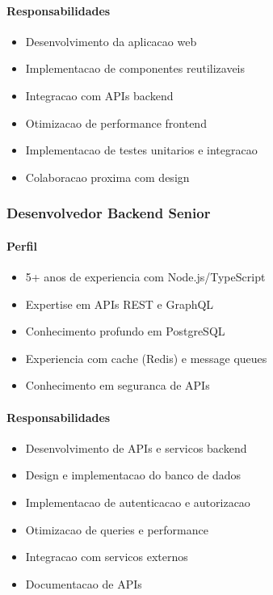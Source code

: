 \paragraph{Responsabilidades}
\begin{itemize}
    \item Desenvolvimento da aplicacao web
    \item Implementacao de componentes reutilizaveis
    \item Integracao com APIs backend
    \item Otimizacao de performance frontend
    \item Implementacao de testes unitarios e integracao
    \item Colaboracao proxima com design
\end{itemize}

\subsubsection{Desenvolvedor Backend Senior}
\paragraph{Perfil}
\begin{itemize}
    \item 5+ anos de experiencia com Node.js/TypeScript
    \item Expertise em APIs REST e GraphQL
    \item Conhecimento profundo em PostgreSQL
    \item Experiencia com cache (Redis) e message queues
    \item Conhecimento em seguranca de APIs
\end{itemize}

\paragraph{Responsabilidades}
\begin{itemize}
    \item Desenvolvimento de APIs e servicos backend
    \item Design e implementacao do banco de dados
    \item Implementacao de autenticacao e autorizacao
    \item Otimizacao de queries e performance
    \item Integracao com servicos externos
    \item Documentacao de APIs
\end{itemize}

